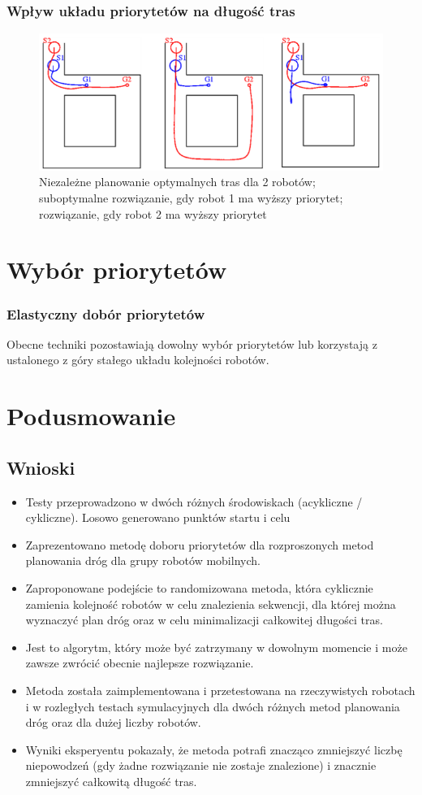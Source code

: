 \subsubsection{Wpływ układu priorytetów na długość tras}
\begin{figure}[H]
	\centering
	\includegraphics[width=13cm]{img/article1/ppt6}
	\caption{Niezależne planowanie optymalnych tras dla 2 robotów; suboptymalne rozwiązanie, gdy robot 1 ma wyższy priorytet; rozwiązanie, gdy robot 2 ma wyższy priorytet}
\end{figure}

\section{Wybór priorytetów}
\subsubsection{Elastyczny dobór priorytetów}
Obecne techniki pozostawiają dowolny wybór priorytetów lub korzystają z ustalonego z góry stałego układu kolejności robotów. \\

\section{Podusmowanie}
\subsection{Wnioski}
\begin{itemize}
	\item Testy przeprowadzono w dwóch różnych środowiskach (acykliczne / cykliczne). Losowo generowano punktów startu i celu
	\item Zaprezentowano metodę doboru priorytetów dla rozproszonych metod planowania dróg dla grupy robotów mobilnych.
	\item Zaproponowane podejście to randomizowana metoda, która cyklicznie zamienia kolejność robotów w celu znalezienia sekwencji, dla której można wyznaczyć plan dróg oraz w celu minimalizacji całkowitej długości tras.
	\item Jest to algorytm, który może być zatrzymany w dowolnym momencie i może zawsze zwrócić obecnie najlepsze rozwiązanie.
	\item Metoda została zaimplementowana i przetestowana na rzeczywistych robotach i w rozległych testach symulacyjnych dla dwóch różnych metod planowania dróg oraz dla dużej liczby robotów.
	\item Wyniki eksperyentu pokazały, że metoda potrafi znacząco zmniejszyć liczbę niepowodzeń (gdy żadne rozwiązanie nie zostaje znalezione) i znacznie zmniejszyć całkowitą długość tras.
\end{itemize}
